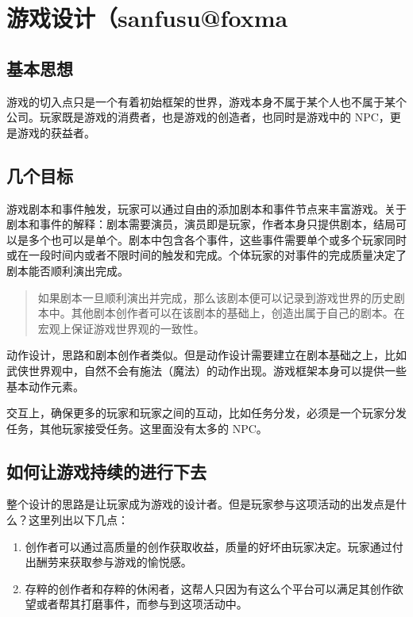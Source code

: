 \documentclass[
]{article}
\author{}
\date{}
\begin{document}
\hypertarget{header-n0}{%
\section{游戏设计（sanfusu@foxma}\label{header-n0}}

\hypertarget{header-n2}{%
\subsection{基本思想}\label{header-n2}}

游戏的切入点只是一个有着初始框架的世界，游戏本身不属于某个人也不属于某个公司。玩家既是游戏的消费者，也是游戏的创造者，也同时是游戏中的
NPC，更是游戏的获益者。

\hypertarget{header-n4}{%
\subsection{几个目标}\label{header-n4}}

游戏剧本和事件触发，玩家可以通过自由的添加剧本和事件节点来丰富游戏。关于剧本和事件的解释：剧本需要演员，演员即是玩家，作者本身只提供剧本，结局可以是多个也可以是单个。剧本中包含各个事件，这些事件需要单个或多个玩家同时或在一段时间内或者不限时间的触发和完成。个体玩家的对事件的完成质量决定了剧本能否顺利演出完成。

\begin{quote}
如果剧本一旦顺利演出并完成，那么该剧本便可以记录到游戏世界的历史剧本中。其他剧本创作者可以在该剧本的基础上，创造出属于自己的剧本。在宏观上保证游戏世界观的一致性。
\end{quote}

动作设计，思路和剧本创作者类似。但是动作设计需要建立在剧本基础之上，比如武侠世界观中，自然不会有施法（魔法）的动作出现。游戏框架本身可以提供一些基本动作元素。

交互上，确保更多的玩家和玩家之间的互动，比如任务分发，必须是一个玩家分发任务，其他玩家接受任务。这里面没有太多的
NPC。

\hypertarget{header-n10}{%
\subsection{如何让游戏持续的进行下去}\label{header-n10}}

整个设计的思路是让玩家成为游戏的设计者。但是玩家参与这项活动的出发点是什么？这里列出以下几点：

\begin{enumerate}
\def\labelenumi{\arabic{enumi}.}
\item
  创作者可以通过高质量的创作获取收益，质量的好坏由玩家决定。玩家通过付出酬劳来获取参与游戏的愉悦感。
\item
  存粹的创作者和存粹的休闲者，这帮人只因为有这么个平台可以满足其创作欲望或者帮其打磨事件，而参与到这项活动中。
\end{enumerate}
\end{document}

